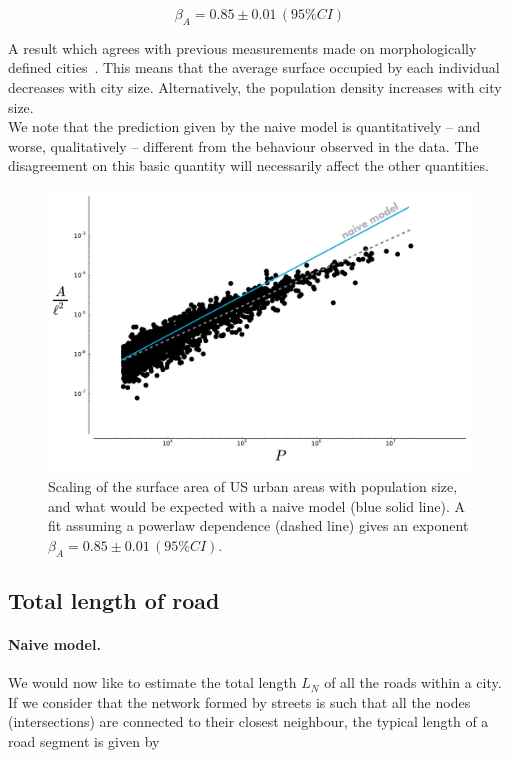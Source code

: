 \begin{equation}
    \boxed{\beta_A = 0.85 \pm 0.01\,(95\% CI)}
\end{equation}

A result which agrees with previous measurements made on morphologically defined
cities~\cite{Batty:2011}. This means that the average surface occupied by each individual decreases with
city size. Alternatively, the population density increases with city size.\\
We note that the prediction given by the naive model is quantitatively -- and
worse, qualitatively -- different from the behaviour observed in the data. The
disagreement on this basic quantity will necessarily affect the other
quantities.

\begin{figure}[!h]
    \centering
    \includegraphics[width=\textwidth]{gfx/chapter-scaling/scaling_area.pdf}
    \caption{Scaling of the surface area of US urban areas with population size,
        and what would be expected with a naive model (blue solid line).
    A fit assuming a powerlaw dependence (dashed line) gives an exponent
    $\beta_A = 0.85 \pm 0.01\,(95\% CI)$.\label{fig:scaling_area}}
\end{figure}



\subsection{Total length of road}
\label{sub:total_length_of_road}

\paragraph{Naive model.} We would now like to estimate the total length $L_N$ of all the roads within a
city. If we consider that the network formed by streets is such that all the
nodes (intersections) are connected to their closest neighbour, the typical
length of a road segment is given by

